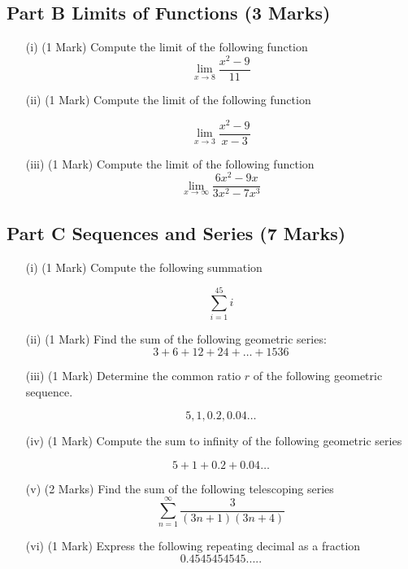 \documentclass[]{article}
\begin{document}
\subsection*{Part B Limits of Functions (3 Marks)}

\begin{itemize}
	\item[(i)] (1 Mark)  Compute the limit of the following function  %
	\[ \lim\limits_{x \rightarrow 8} \frac{x^2-9}{11}\]
	
	\item[(ii)] (1 Mark)  Compute the limit of the following function %
	
	\[\lim_{x \to 3 } \frac{x^2-9}{x-3}\]
	
	\item[(iii)] (1 Mark)  Compute the limit of the following function %
	\[ \lim_{x \to \infty } \frac{6x^2 - 9x }{3x^2 - 7x^3} \]	
	
\end{itemize}
\newpage

\subsection*{Part C Sequences and Series (7 Marks)}

\begin{itemize}
	\item[(i)] (1 Mark)  Compute the following summation
	
	\[ \sum_{i=1}^{45} i \]
	
	\item[(ii)] (1 Mark) Find the sum of the following geometric series: 
\[3 + 6 + 12 + 24 + \ldots + 1536\]
	
	\item[(iii)] (1 Mark) Determine the common ratio $r$ of the following geometric sequence. 
	
	\[ 5, 1,0.2,0.04\ldots \]
	
	\item[(iv)] (1 Mark) Compute the sum to infinity of the following geometric series
	
	\[ 5 + 1 + 0.2 + 0.04\ldots \]
	
	\item[(v)] (2 Marks) Find the sum of the following telescoping series
	\[  \sum^{\infty}_{n=1}   \frac{3}{(3n+1)(3n+4)}  \]
	
	\item[(vi)] (1 Mark) Express the following repeating decimal as a fraction
	\[0.4545454545.....\]
\end{itemize}
\end{document}
